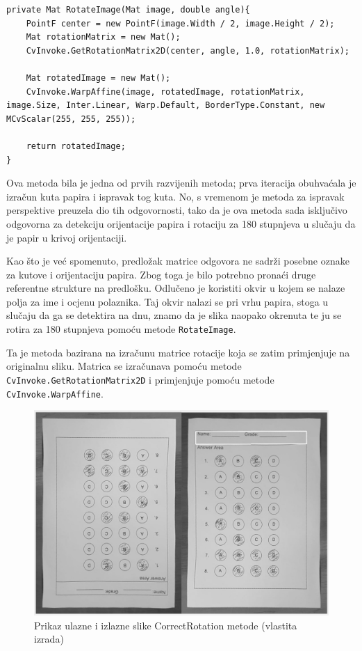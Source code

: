 \documentclass{foi}
\begin{document}
\pagebreak
\begin{lstlisting}[caption={Metoda za rotaciju slike}]
private Mat RotateImage(Mat image, double angle){
    PointF center = new PointF(image.Width / 2, image.Height / 2);
    Mat rotationMatrix = new Mat();
    CvInvoke.GetRotationMatrix2D(center, angle, 1.0, rotationMatrix);

    Mat rotatedImage = new Mat();
    CvInvoke.WarpAffine(image, rotatedImage, rotationMatrix, image.Size, Inter.Linear, Warp.Default, BorderType.Constant, new MCvScalar(255, 255, 255));

    return rotatedImage;
}
\end{lstlisting}

Ova metoda bila je jedna od prvih razvijenih metoda; prva iteracija obuhvaćala je izračun kuta papira i ispravak tog kuta. No, s vremenom je metoda za ispravak perspektive preuzela dio tih odgovornosti, tako da je ova metoda sada isključivo odgovorna za detekciju orijentacije papira i rotaciju za 180 stupnjeva u slučaju da je papir u krivoj orijentaciji.

Kao što je već spomenuto, predložak matrice odgovora ne sadrži posebne oznake za kutove i orijentaciju papira. Zbog toga je bilo potrebno pronaći druge referentne strukture na predlošku. Odlučeno je koristiti okvir u kojem se nalaze polja za ime i ocjenu polaznika. Taj okvir nalazi se pri vrhu papira, stoga u slučaju da ga se detektira na dnu, znamo da je slika naopako okrenuta te ju se rotira za 180 stupnjeva pomoću metode \texttt{RotateImage}.

Ta je metoda bazirana na izračunu matrice rotacije koja se zatim primjenjuje na originalnu sliku. Matrica se izračunava pomoću metode \texttt{CvInvoke.GetRotationMatrix2D} i primjenjuje pomoću metode \texttt{CvInvoke.WarpAffine}.

\begin{figure}[H]
\centering
\includegraphics[width=0.7\linewidth]{slike/RotationComparison.png}
\caption{Prikaz ulazne i izlazne slike CorrectRotation metode (vlastita izrada)}
\end{figure}
\end{document}
